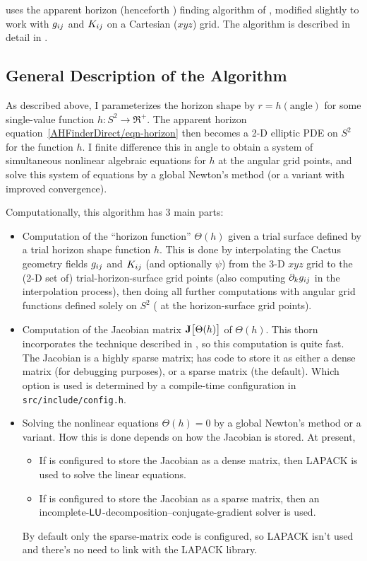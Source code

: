  uses the apparent horizon
(henceforth ) finding algorithm of
\cite{AHFinderDirect/Thornburg95},
modified slightly to work with $g_{ij}$ and $K_{ij}$ on a Cartesian ($xyz$)
grid.  The algorithm is described in detail in
\cite{AHFinderDirect/Thornburg2003:AH-finding}.


\subsection{General Description of the Algorithm}

As described above, I parameterizes the horizon shape by
$r = h(\text{angle})$ for some single-value function $h: S^2 \to \Re^+$.
The apparent horizon equation~\eqref{AHFinderDirect/eqn-horizon}
then becomes a 2-D elliptic PDE on $S^2$ for the function $h$.  I finite
difference this in angle to obtain a system of simultaneous nonlinear
algebraic equations for $h$ at the angular grid points, and solve this
system of equations by a global Newton's method (or a variant with
improved convergence).

Computationally, this algorithm has 3 main parts:
\begin{itemize}
\item	Computation of the ``horizon function'' $\Theta(h)$ given a trial
	surface defined by a trial horizon shape function $h$.  This is
	done by interpolating the Cactus geometry fields $g_{ij}$ and
	$K_{ij}$ (and optionally $\psi$) from the 3-D $xyz$ grid to the
	(2-D set of) trial-horizon-surface grid points (also computing
	$\partial_k g_{ij}$ in the interpolation process), then doing
	all further computations with angular grid functions defined
	solely on $S^2$ (\ie{} at the horizon-surface grid points).
\item	Computation of the Jacobian matrix $\Jac[\Theta(h)]$ of $\Theta(h)$.
	This thorn incorporates the  technique
	described in \cite{AHFinderDirect/Thornburg95},
	so this computation is quite fast.  The Jacobian is a highly
	sparse matrix;  has code to store it
	as either a dense matrix (for debugging purposes), or a sparse
	matrix (the default).  Which option is used is determined by
	a compile-time configuration in \verb|src/include/config.h|.
\item	Solving the nonlinear equations $\Theta(h) = 0$ by a global
	Newton's method or a variant.  How this is done depends on how
	the Jacobian is stored.  At present,
	\begin{itemize}
	\item	If  is configured to store the
		Jacobian as a dense matrix, then LAPACK is used to solve
		the linear equations.
	\item	If  is configured to store the
		Jacobian as a sparse matrix, then an
		incomplete-$\sf LU$-decomposition--conjugate-gradient
		solver is used.
	\end{itemize}
	By default only the sparse-matrix code is configured, so LAPACK
	isn't used and there's no need to link with the LAPACK library.
\end{itemize}

